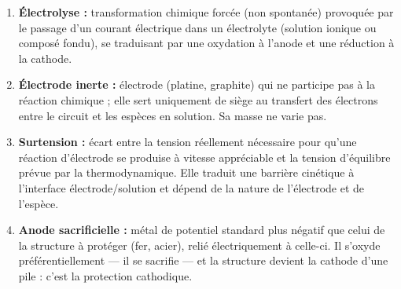 \documentclass[11pt]{article}
\newcommand{\cle}[1]{{\popxbold\color{popdark}#1}}
\newcounter{popsec}
\newcounter{popsub}
\newcommand{\courssub}[1]{%
  \stepcounter{popsub}%
  \par\vspace{9pt}\noindent{\popxbold\fontsize{11.5}{13}\selectfont\color{popink}{\color{poporange}\thepopsec.\thepopsub}\hspace{6pt}#1}\par\nopagebreak\vspace{4pt}
}
\begin{document}
\begin{corrige}
\begin{enumerate}
\item \textbf{Électrolyse :} transformation chimique forcée (non spontanée) provoquée par le passage d'un courant électrique dans un électrolyte (solution ionique ou composé fondu), se traduisant par une oxydation à l'anode et une réduction à la cathode.
\item \textbf{Électrode inerte :} électrode (platine, graphite) qui ne participe pas à la réaction chimique ; elle sert uniquement de siège au transfert des électrons entre le circuit et les espèces en solution. Sa masse ne varie pas.
\item \textbf{Surtension :} écart entre la tension réellement nécessaire pour qu'une réaction d'électrode se produise à vitesse appréciable et la tension d'équilibre prévue par la thermodynamique. Elle traduit une barrière cinétique à l'interface électrode/solution et dépend de la nature de l'électrode et de l'espèce.
\item \textbf{Anode sacrificielle :} métal de potentiel standard plus négatif que celui de la structure à protéger (fer, acier), relié électriquement à celle-ci. Il s'oxyde préférentiellement --- il se \og sacrifie \fg{} --- et la structure devient la cathode d'une pile : c'est la \cle{protection cathodique}.
\end{enumerate}
\end{corrige}

\courssub{Je m'entraîne}
\end{document}
